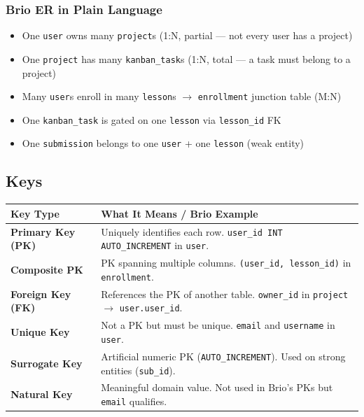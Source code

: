 \documentclass[11pt,a4paper]{article}
\newcommand{\T}[1]{\texttt{#1}}          %
\begin{document}
\subsubsection{Brio ER in Plain Language}

\begin{itemize}[nosep, leftmargin=1.5em]
  \item One \T{user} owns many \T{project}s (1:N, partial — not every user has a project)
  \item One \T{project} has many \T{kanban\_task}s (1:N, total — a task must belong to a project)
  \item Many \T{user}s enroll in many \T{lesson}s $\to$ \T{enrollment} junction table (M:N)
  \item One \T{kanban\_task} is gated on one \T{lesson} via \T{lesson\_id} FK
  \item One \T{submission} belongs to one \T{user} + one \T{lesson} (weak entity)
\end{itemize}

\subsection{Keys}

\begin{center}
\renewcommand{\arraystretch}{1.3}
\begin{tabular}{@{}p{3.2cm}p{9.5cm}@{}}
\toprule
\textbf{Key Type} & \textbf{What It Means / Brio Example} \\
\midrule
\textbf{Primary Key (PK)} & Uniquely identifies each row. \T{user\_id INT AUTO\_INCREMENT} in \T{user}. \\
\textbf{Composite PK} & PK spanning multiple columns. \T{(user\_id, lesson\_id)} in \T{enrollment}. \\
\textbf{Foreign Key (FK)} & References the PK of another table. \T{owner\_id} in \T{project} $\to$ \T{user.user\_id}. \\
\textbf{Unique Key} & Not a PK but must be unique. \T{email} and \T{username} in \T{user}. \\
\textbf{Surrogate Key} & Artificial numeric PK (\T{AUTO\_INCREMENT}). Used on strong entities (\T{sub\_id}). \\
\textbf{Natural Key} & Meaningful domain value. Not used in Brio's PKs but \T{email} qualifies. \\
\bottomrule
\end{tabular}
\end{center}
\end{document}
